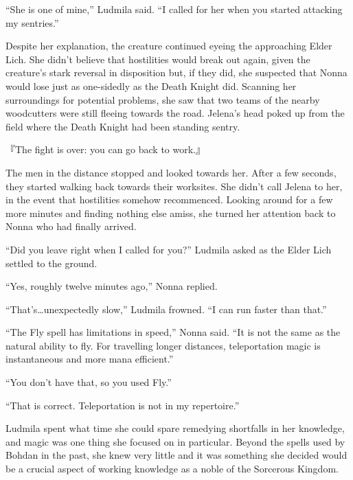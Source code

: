  

“She is one of mine,” Ludmila said. “I called for her when you started attacking my sentries.”

 

Despite her explanation, the creature continued eyeing the approaching Elder Lich. She didn’t believe that hostilities would break out again, given the creature’s stark reversal in disposition but, if they did, she suspected that Nonna would lose just as one-sidedly as the Death Knight did. Scanning her surroundings for potential problems, she saw that two teams of the nearby woodcutters were still fleeing towards the road. Jelena’s head poked up from the field where the Death Knight had been standing sentry.

 

『The fight is over: you can go back to work.』

 

The men in the distance stopped and looked towards her. After a few seconds, they started walking back towards their worksites. She didn’t call Jelena to her, in the event that hostilities somehow recommenced. Looking around for a few more minutes and finding nothing else amiss, she turned her attention back to Nonna who had finally arrived.

 

“Did you leave right when I called for you?” Ludmila asked as the Elder Lich settled to the ground.

 

“Yes, roughly twelve minutes ago,” Nonna replied.

 

“That’s…unexpectedly slow,” Ludmila frowned. “I can run faster than that.”

 

“The Fly spell has limitations in speed,” Nonna said. “It is not the same as the natural ability to fly. For travelling longer distances, teleportation magic is instantaneous and more mana efficient.”

 

“You don’t have that, so you used Fly.”

 

“That is correct. Teleportation is not in my repertoire.”

 

Ludmila spent what time she could spare remedying shortfalls in her knowledge, and magic was one thing she focused on in particular. Beyond the spells used by Bohdan in the past, she knew very little and it was something she decided would be a crucial aspect of working knowledge as a noble of the Sorcerous Kingdom.

